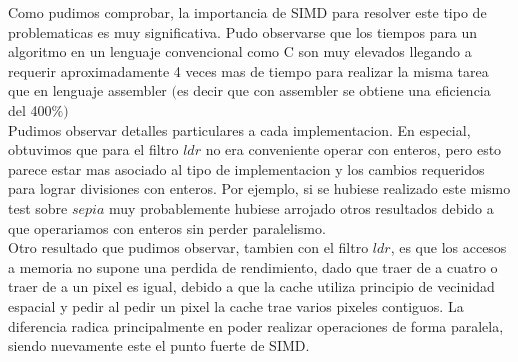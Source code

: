 Como pudimos comprobar, la importancia de SIMD para resolver este tipo de problematicas es muy significativa. 
Pudo observarse que los tiempos para un algoritmo en un lenguaje convencional como C son muy elevados llegando a requerir aproximadamente 4 veces mas de tiempo para realizar la misma tarea que en lenguaje assembler $($es decir que con assembler se obtiene una eficiencia del 400$ \% )$\\

Pudimos observar detalles particulares a cada implementacion. En especial, obtuvimos que para el filtro $ldr$ no era conveniente operar con enteros, pero esto parece estar mas asociado al tipo de implementacion y los cambios requeridos para lograr divisiones con enteros. Por ejemplo, si se hubiese realizado este mismo test sobre $sepia$ muy probablemente hubiese arrojado otros resultados debido a que operariamos con enteros sin perder paralelismo.\\

Otro resultado que pudimos observar, tambien con el filtro $ldr$, es que los accesos a memoria no supone una perdida de rendimiento, dado que traer de a cuatro o traer de a un pixel es igual, debido a que la cache utiliza principio de vecinidad espacial y pedir al pedir un pixel la cache trae varios pixeles contiguos. La diferencia radica principalmente en poder realizar operaciones de forma paralela, siendo nuevamente este el punto fuerte de SIMD. \\


